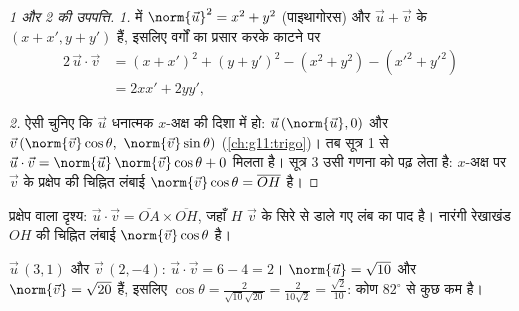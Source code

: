 \begin{proof}[1 और 2 की उपपत्ति]
\emph{1.}  में $\norm{\vec u}^2 = x^2 + y^2$ (पाइथागोरस) और $\vec u + \vec v$ के  $(x + x', y + y')$ हैं,
इसलिए वर्गों का प्रसार करके काटने पर
\begin{align*}
2\,\vec u \cdot \vec v
&= (x + x')^2 + (y + y')^2 - (x^2 + y^2) - (x'^2 + y'^2)\\
&= 2xx' + 2yy',
\end{align*}

\emph{2.}  ऐसी चुनिए कि $\vec u$ धनात्मक $x$-अक्ष की दिशा में
हो: $\vec u\,(\norm{\vec u}, 0)$ और $\vec v\,(\norm{\vec v}\cos\theta,\ \norm{\vec v}\sin\theta)$ (\cref{ch:g11:trigo})। तब सूत्र 1 से $\vec u \cdot \vec v = \norm{\vec u}\,\norm{\vec v}\cos\theta + 0$ मिलता है। सूत्र 3 उसी गणना को
पढ़ लेता है: $x$-अक्ष पर $\vec v$ के प्रक्षेप की चिह्नित लंबाई $\norm{\vec v}\cos\theta =
\overline{OH}$ है।
\end{proof}

\begin{omfigure}

{\small प्रक्षेप वाला दृश्य: $\vec u \cdot \vec v = \overline{OA} \times
\overline{OH}$, जहाँ $H$ $\vec v$ के सिरे से डाले गए लंब का
पाद है। नारंगी रेखाखंड $OH$ की चिह्नित लंबाई $\norm{\vec v}\cos\theta$ है।}
\end{omfigure}

\begin{example}\label{ex:g11:scal:compute}
$\vec u\,(3, 1)$ और $\vec v\,(2, -4)$: $\vec u \cdot \vec v = 6 - 4 = 2$।  $\norm{\vec u} = \sqrt{10}$ और $\norm{\vec v} = \sqrt{20}$ हैं, इसलिए $\cos\theta = \frac{2}{\sqrt{10}\sqrt{20}} = \frac{2}{10\sqrt2}
= \frac{\sqrt2}{10}$: कोण $82^\circ$ से कुछ
कम है।
\end{example}

